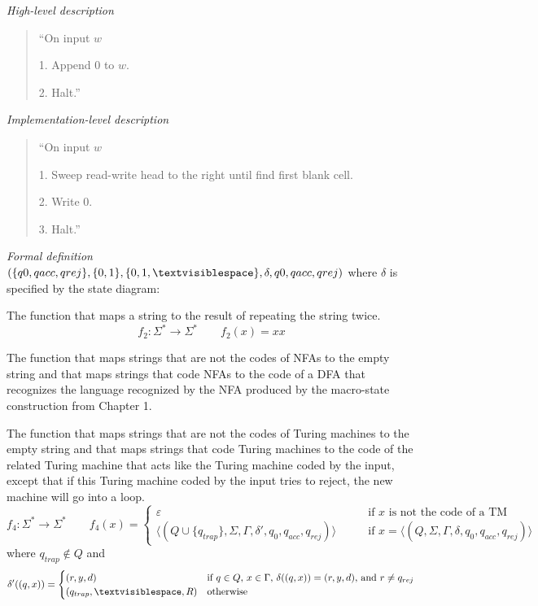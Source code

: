 \documentclass[12pt, oneside]{article}
\begin{document}
{\it High-level description}
\begin{quote}
    ``On input $w$
    
    1. Append $0$ to $w$.
    
    2. Halt.''
\end{quote}

{\it Implementation-level description}
\begin{quote}
    ``On input $w$
    
    1. Sweep read-write head to the right until find first blank cell.
    
    2. Write 0.
    
    3. Halt.''
\end{quote}

{\it Formal definition} $(\{q0, qacc, qrej\}, \{0,1\}, \{0,1,\textvisiblespace\},\delta, q0, qacc, qrej)$
where $\delta$ is specified by the state diagram: 


\newpage


The function that maps a string to the result of repeating the string twice.
\[
f_2: \Sigma^* \to \Sigma^* \qquad f_2( x )  =  xx
\]

\vfill


The function that maps strings that are not the codes of NFAs to the empty 
string and that maps strings that code NFAs to the code of a DFA that recognizes
the language recognized by the NFA produced by the macro-state construction from Chapter 1.


\vfill


The function that maps strings that are not the codes of Turing machines to the empty 
string and that maps strings that code Turing machines to the code of the 
related Turing machine that acts like the Turing machine coded by the input, except
that if this Turing machine coded by the input tries to reject, the 
new machine will go into a loop.
\[
f_4: \Sigma^* \to \Sigma^*  \qquad f_4( x )  =   \begin{cases}  \varepsilon \qquad&\text{if $x$ is not the code of  a TM} \\
\langle (Q \cup \{q_{trap} \}, \Sigma, \Gamma, \delta', q_0, q_{acc}, q_{rej} ) \rangle \qquad&\text{if $x = \langle (Q, \Sigma, \Gamma, \delta, q_0, q_{acc}, q_{rej} )\rangle$}\end{cases}
\]
where $q_{trap} \notin Q$ and 
\[\delta'( (q,x) ) = \begin{cases}
(r,y,d) &\text{if $q \in Q$, $x \in \Gamma$, $\delta ((q,x)) = (r,y,d)$, and  $r \neq  q_{rej}$} \\
(q_{trap}, \textvisiblespace, R) & \text{otherwise}
\end{cases}
\]
\vfill
\vfill
\end{document}
